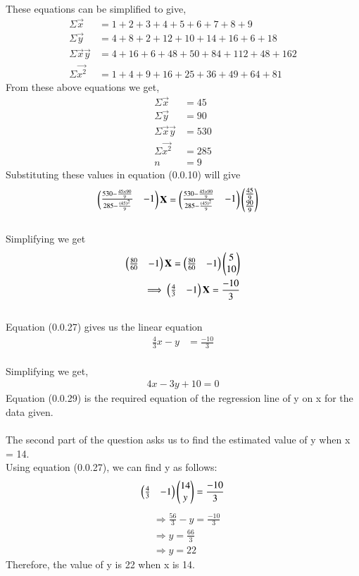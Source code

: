 \documentclass[journal,12pt,twocolumn]{IEEEtran}
\begin{document}
These equations can be simplified to give,
\begin{align}
 \Sigma \vec{x}  &= 1 + 2 + 3 + 4 + 5 + 6 + 7 + 8 + 9\\
 \Sigma \vec{y}  &= 4 + 8 + 2 + 12 + 10 + 14 + 16 + 6 + 18\\
 \Sigma \vec{x}\vec{y} &= 4 + 16 + 6 + 48 + 50 + 84 + 112 + 48 + 162\\
 \Sigma \vec{x^2} &= 1 + 4 + 9 + 16 + 25 + 36 + 49 + 64 + 81
\end{align}
From these above equations we get,\\
\begin{align}
 \Sigma \vec{x}  &= 45\\
 \Sigma \vec{y}  &= 90\\
 \Sigma \vec{x}\vec{y} &= 530\\
 \Sigma \vec{x^2} &= 285\\
 n &= 9
\end{align}
Substituting these values in equation (0.0.10) will give\\
\begin{align}
    \begin{pmatrix}\frac{530 - \frac{45 \times 90}{9}}{285 - \frac{(45)^2}{9}} & -1\end{pmatrix}\mathbf{X} &= \begin{pmatrix}\frac{530 - \frac{45 \times 90}{9}}{285 - \frac{(45)^2}{9}} & -1\end{pmatrix}\begin{pmatrix}\frac{45}{9} \\ \frac{90}{9}\end{pmatrix}
\end{align}\\
Simplifying we get
\begin{align}
    \begin{pmatrix}\frac{80}{60} & -1\end{pmatrix}\mathbf{X} = \begin{pmatrix}\frac{80}{60} & -1\end{pmatrix}\begin{pmatrix}5 \\ 10\end{pmatrix}
    \\
    \implies \begin{pmatrix}\frac{4}{3} & -1\end{pmatrix}\mathbf{X} = \frac{-10}{3}
\end{align}\\
Equation (0.0.27) gives us the linear equation\\
\begin{align}
    \frac{4}{3} x - y &= \frac{-10}{3}
\end{align}\\
Simplifying we get,
\begin{align}
    4x - 3y + 10 = 0 
\end{align}
Equation (0.0.29) is the required equation of the regression line of y on x for the data given.\\\\
The second part of the question asks us to find the estimated value of y when x = 14.\\
Using equation (0.0.27), we can find y as follows:\\
\begin{align}
    \begin{pmatrix}\frac{4}{3} & -1\end{pmatrix}\begin{pmatrix}14 \\ y\end{pmatrix} = \frac{-10}{3}
\end{align}
\begin{align}
    &\Rightarrow \frac{56}{3} - y = \frac{-10}{3}\\
    &\Rightarrow y = \frac{66}{3}\\
    &\Rightarrow y = 22
\end{align}
Therefore, the value of y is 22 when x is 14.\\
\end{document}
